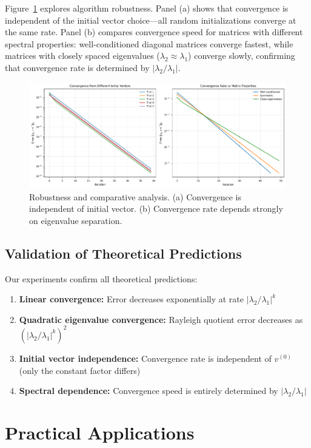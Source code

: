 \documentclass[11pt,a4paper]{article}
\begin{document}
Figure~\ref{fig:comparison} explores algorithm robustness. Panel (a) shows that convergence is independent of the initial vector choice—all random initializations converge at the same rate. Panel (b) compares convergence speed for matrices with different spectral properties: well-conditioned diagonal matrices converge fastest, while matrices with closely spaced eigenvalues ($\lambda_2 \approx \lambda_1$) converge slowly, confirming that convergence rate is determined by $|\lambda_2/\lambda_1|$.

\begin{figure}[t]
    \centering
    \includegraphics[width=\textwidth]{comparison_analysis.png}
    \caption{Robustness and comparative analysis. (a) Convergence is independent of initial vector. (b) Convergence rate depends strongly on eigenvalue separation.}
    \label{fig:comparison}
\end{figure}

\subsection{Validation of Theoretical Predictions}

Our experiments confirm all theoretical predictions:
\begin{enumerate}
    \item \textbf{Linear convergence:} Error decreases exponentially at rate $|\lambda_2/\lambda_1|^k$
    \item \textbf{Quadratic eigenvalue convergence:} Rayleigh quotient error decreases as $(|\lambda_2/\lambda_1|^k)^2$
    \item \textbf{Initial vector independence:} Convergence rate is independent of $v^{(0)}$ (only the constant factor differs)
    \item \textbf{Spectral dependence:} Convergence speed is entirely determined by $|\lambda_2/\lambda_1|$
\end{enumerate}

\section{Practical Applications}
\end{document}
